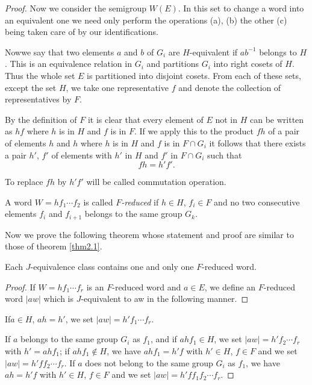 \begin{proof}
Now we consider the semigroup $W(E)$. In this set to change a word
into an equivalent one we need only perform the operations (a), (b)
the other (c) being taken care of by our identifications. 

Now\pageoriginale we say that two elements $a$ and $b$  of $G_i$ are
$H$-equivalent if $ab^{-1}$ belongs to $H$. This is an equivalence
relation in $G_i$ and partitions $G_i$ into right cosets of $H$. Thus
the whole set $E$ is partitioned into disjoint cosets. From each of
these sets, except the set $H$, we take one representative $f$ and
denote the collection of representatives by $F$.  

By the definition of $F$ it is  clear that every element of $E$ not
in $H$ can be written  as $hf$ where $h$ is in $H$ and $f$ is in
$F$. If we apply this to the product $fh$ of a pair of elements $h$
and $ h$ where $h$ is in $H$ and $f$ is in $F \cap G_i$ it follows 
that there exists a pair $h'$, $f'$ of elements with $h'$ in $H$ and
$f'$ in $F \cap G_i$ such that  
$$
fh = h' f'.
$$  

To replace $fh$ by $h' f'$ will be called commutation operation.  

\begin{defi*} 
A word $W = hf_1 \cdots f_2$ is called \textit{$F$-reduced} if $h \in
H$, $f_i \in F$ and no two consecutive elements $f_i$ and $f_{i+1}$
belongs to the same group $G_k$.  
\end{defi*}

Now we prove the following theorem whose statement and proof are
similar to those of theorem \ref{thm2.1}. 

\begin{theorem}\label{thm2.7} %
Each $J$-equivalence class contains one and only one $F$-reduced word.  
\end{theorem}

\begin{proof}
If $W = hf_1 \cdots f_r$ is an $F$-reduced word and $a \in E$, we
define an $F$-reduced word $|  aw |$ which is $J$-equivalent to aw in
the following manner. 
\end{proof}

If\pageoriginale $a \in H$, $ah = h'$, we set $| aw  |= h' f_1 \cdots
f_r$. 

If $a$ belongs to the same group $G_i$ as $f_1$, and if $ahf_1 \in H$,
we set $| aw |= h' f_2 \cdots f_r$ with $h'= ahf_1$; if $ahf_1
\notin H$, we have $ahf_1= h' f $ with $h' \in H$, $f \in F$ and we
set $|aw| = h' ff_2 \cdots f_r$. If $a$ does not belong to the same group
$G_i$ as $f_1$, we have $ah = h' f$ with $h' \in H$, $f \in F$ and we
set $| aw |  =  h'  ff_1 f_2 \cdots  f_r$. 


\end{proof}
